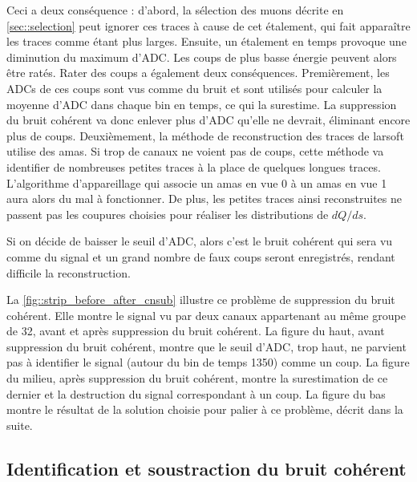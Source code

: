       Ceci a deux conséquence : d'abord, la sélection des muons décrite en \autoref{sec::selection} peut ignorer ces traces à cause de cet étalement, qui fait apparaître les traces comme étant plus larges. Ensuite, un étalement en temps provoque une diminution du maximum d'ADC. Les coups de plus basse énergie peuvent alors être ratés. Rater des coups a également deux conséquences. Premièrement, les ADCs de ces coups sont vus comme du bruit et sont utilisés pour calculer la moyenne d'ADC dans chaque bin en temps, ce qui la surestime. La suppression du bruit cohérent va donc enlever plus d'ADC qu'elle ne devrait, éliminant encore plus de coups.  Deuxièmement, la méthode de reconstruction des traces de \gls{larsoft} utilise des amas. Si trop de canaux ne voient pas de coups, cette méthode va identifier de nombreuses petites traces à la place de quelques longues traces. L'algorithme d'appareillage qui associe un amas en vue 0 à un amas en vue 1 aura alors du mal à fonctionner. De plus, les petites traces ainsi reconstruites ne passent pas les coupures choisies pour réaliser les distributions de $dQ/ds$.

      Si on décide de baisser le seuil d'ADC, alors c'est le bruit cohérent qui sera vu comme du signal et un grand nombre de faux coups seront enregistrés, rendant difficile la reconstruction.

      La \autoref{fig::strip_before_after_cnsub} illustre ce problème de suppression du bruit cohérent. Elle montre le signal vu par deux canaux appartenant au même groupe de 32, avant et après suppression du bruit cohérent. La figure du haut, avant suppression du bruit cohérent, montre que le seuil d'ADC, trop haut, ne parvient pas à identifier le signal (autour du bin de temps 1350) comme un coup.  La figure du milieu, après suppression du bruit cohérent, montre la surestimation de ce dernier et la destruction du signal correspondant à un coup. La figure du bas montre le résultat de la solution choisie pour palier à ce problème, décrit dans la suite.

    \subsection{Identification et soustraction du bruit cohérent}

